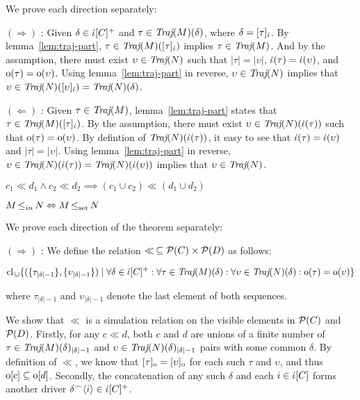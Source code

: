 We prove each direction separately:

$(\Rightarrow)$ : Given $\delta \in \dot{\iota}[C]^{+}$ and $\tau \in \operatorname{\textit{Traj}}(M)(\delta)$, where $\delta = [\tau]_{\dot{\iota}}$. By lemma~\ref{lem:traj-part}, $\tau \in \operatorname{\textit{Traj}}(M)([\tau]_{\dot{\iota}})$ implies $\tau \in \operatorname{\textit{Traj}}(M)$. And by the assumption, there must exist $\upsilon \in \operatorname{\textit{Traj}}(N)$ such that $| \tau | = | \upsilon |$, $\dot{\iota}(\tau) = \dot{\iota}(\upsilon)$, and $\mathrm{o}(\tau) = \mathrm{o}(\upsilon)$. Using lemma~\ref{lem:traj-part} in reverse, $\upsilon \in \operatorname{\textit{Traj}}(N)$ implies that $\upsilon \in \operatorname{\textit{Traj}}(N)([\upsilon]_{\dot{\iota}}) = \operatorname{\textit{Traj}}(N)(\delta)$.

$(\Leftarrow)$ : Given $\tau \in \operatorname{\textit{Traj}}(M)$, lemma~\ref{lem:traj-part} states that $\tau \in \operatorname{\textit{Traj}}(M)([\tau]_{\dot{\iota}})$. By the assumption, there must exist $\upsilon \in \operatorname{\textit{Traj}}(N)(\dot{\iota}(\tau))$ such that $\mathrm{o}(\tau) = \mathrm{o}(\upsilon)$. By defintion of $\operatorname{\textit{Traj}}(N)(\dot{\iota}(\tau))$, it easy to see that $\dot{\iota}(\tau) = \dot{\iota}(\upsilon)$ and $| \tau | = | \upsilon |$. Using lemma~\ref{lem:traj-part} in reverse, $\upsilon \in \operatorname{\textit{Traj}}(N)(\dot{\iota}(\tau)) = \operatorname{\textit{Traj}}(N)(\dot{\iota}(\upsilon))$ implies that $\upsilon \in \operatorname{\textit{Traj}}(N)$.

\begin{lemma} \label{lem:cl-union}
$c_{1} \ll d_{1} \wedge c_{2} \ll d_{2} \implies (c_{1} \cup c_{2}) \ll (d_{1} \cup d_{2})$
\end{lemma}


\begin{lemma} \label{lem:in-iff-sim}
$M \operatorname{\leq}_{in} N \Leftrightarrow M \operatorname{\operatorname{\leq}_{\textrm{set}}} N$
\end{lemma}

We prove each direction of the theorem separately:

$(\Rightarrow)$ : We define the relation $\ll \, \subseteq \mathcal{P}(C) \times \mathcal{P}(D)$ as follows:

\begin{equation*}
\textrm{cl}_{\, \cup} \{ ( \{ \tau_{| \delta | - 1} \} , \{ \upsilon_{| \delta | - 1} \} ) \mid \forall \delta \in \dot{\iota}[C]^{+} : \forall \tau \in \operatorname{\textit{Traj}}(M)(\delta) : \forall \upsilon \in \operatorname{\textit{Traj}}(N)(\delta) : \mathrm{o}(\tau) = \mathrm{o}(\upsilon) \}
\end{equation*}

\noindent where $\tau_{| \delta | - 1}$ and $\upsilon_{| \delta | - 1}$ denote the last element of both sequences.

We show that $\ll$ is a simulation relation on the visible elements in $\mathcal{P}(C)$ and $\mathcal{P}(D)$. Firstly, for any $c \ll d$, both $c$ and $d$ are unions of a finite number of $\tau \in \operatorname{\textit{Traj}}(M)(\delta)_{| \delta | - 1}$ and $\upsilon \in \operatorname{\textit{Traj}}(N)(\delta)_{| \delta | - 1}$ pairs with some common $\delta$. By definition of $\ll$, we know that $[\tau]_{\mathrm{o}} = [\upsilon]_{\mathrm{o}}$ for each such $\tau$ and $\upsilon$, and thus $\mathrm{o}[c] \subseteq \mathrm{o}[d]$. Secondly, the concatenation of any such $\delta$ and each $i \in \dot{\iota}[C]$ forms another driver $\delta^{\frown} \langle i \rangle \in \dot{\iota}[C]^{+}$. 

